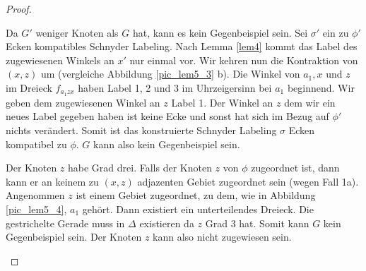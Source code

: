 \begin{proof}
\begin{description}[leftmargin =0pt, font = \bfseries]
Da $G'$ weniger Knoten als $G$ hat, kann es kein Gegenbeispiel sein. Sei $\sigma'$ ein zu $\phi'$ Ecken kompatibles Schnyder Labeling. Nach Lemma \ref{lem4} kommt das Label des zugewiesenen Winkels an $x'$ nur einmal vor. Wir kehren nun die Kontraktion von $(x,z)$ um (vergleiche Abbildung \ref{pic_lem5_3} b). Die Winkel von $a_1,x$ und $z$ im Dreieck $f_{a_1zx}$ haben Label 1, 2 und 3 im Uhrzeigersinn bei $a_1$ beginnend. Wir geben dem zugewiesenen Winkel an $z$ Label 1. Der Winkel an $z$ dem wir ein neues Label gegeben haben ist keine Ecke und sonst hat sich im Bezug auf $\phi'$ nichts verändert. Somit ist das konstruierte Schnyder Labeling $\sigma$ Ecken kompatibel zu $\phi$. $G$ kann also kein Gegenbeispiel sein.
\item[Fall 1b] Der Knoten $z$ habe Grad drei. Falls der Knoten $z$ von $\phi$ zugeordnet ist, dann kann er an keinem zu $(x,z)$ adjazenten Gebiet zugeordnet sein (wegen Fall 1a). Angenommen $z$ ist einem Gebiet zugeordnet, zu dem, wie in Abbildung \ref{pic_lem5_4}, $a_1$ gehört. Dann existiert ein unterteilendes Dreieck. Die gestrichelte Gerade muss in $\Delta$ existieren da $z$ Grad 3 hat. Somit kann $G$ kein Gegenbeispiel sein. Der Knoten $z$ kann also nicht zugewiesen sein.


\end{description}
\end{proof}
